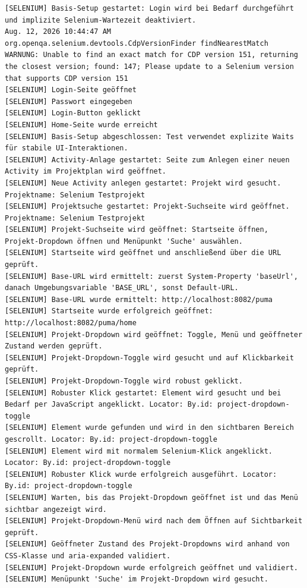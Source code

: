 \begin{lstlisting}[caption={Selenium -- Neue Activity (Erfolgreich)}, label={lst:sel_new_act_ok}, style=logStyle]
[SELENIUM] Basis-Setup gestartet: Login wird bei Bedarf durchgeführt und implizite Selenium-Wartezeit deaktiviert.
Aug. 12, 2026 10:44:47 AM org.openqa.selenium.devtools.CdpVersionFinder findNearestMatch
WARNUNG: Unable to find an exact match for CDP version 151, returning the closest version; found: 147; Please update to a Selenium version that supports CDP version 151
[SELENIUM] Login-Seite geöffnet
[SELENIUM] Passwort eingegeben
[SELENIUM] Login-Button geklickt
[SELENIUM] Home-Seite wurde erreicht
[SELENIUM] Basis-Setup abgeschlossen: Test verwendet explizite Waits für stabile UI-Interaktionen.
[SELENIUM] Activity-Anlage gestartet: Seite zum Anlegen einer neuen Activity im Projektplan wird geöffnet.
[SELENIUM] Neue Activity anlegen gestartet: Projekt wird gesucht. Projektname: Selenium Testprojekt
[SELENIUM] Projektsuche gestartet: Projekt-Suchseite wird geöffnet. Projektname: Selenium Testprojekt
[SELENIUM] Projekt-Suchseite wird geöffnet: Startseite öffnen, Projekt-Dropdown öffnen und Menüpunkt 'Suche' auswählen.
[SELENIUM] Startseite wird geöffnet und anschließend über die URL geprüft.
[SELENIUM] Base-URL wird ermittelt: zuerst System-Property 'baseUrl', danach Umgebungsvariable 'BASE_URL', sonst Default-URL.
[SELENIUM] Base-URL wurde ermittelt: http://localhost:8082/puma
[SELENIUM] Startseite wurde erfolgreich geöffnet: http://localhost:8082/puma/home
[SELENIUM] Projekt-Dropdown wird geöffnet: Toggle, Menü und geöffneter Zustand werden geprüft.
[SELENIUM] Projekt-Dropdown-Toggle wird gesucht und auf Klickbarkeit geprüft.
[SELENIUM] Projekt-Dropdown-Toggle wird robust geklickt.
[SELENIUM] Robuster Klick gestartet: Element wird gesucht und bei Bedarf per JavaScript angeklickt. Locator: By.id: project-dropdown-toggle
[SELENIUM] Element wurde gefunden und wird in den sichtbaren Bereich gescrollt. Locator: By.id: project-dropdown-toggle
[SELENIUM] Element wird mit normalem Selenium-Klick angeklickt. Locator: By.id: project-dropdown-toggle
[SELENIUM] Robuster Klick wurde erfolgreich ausgeführt. Locator: By.id: project-dropdown-toggle
[SELENIUM] Warten, bis das Projekt-Dropdown geöffnet ist und das Menü sichtbar angezeigt wird.
[SELENIUM] Projekt-Dropdown-Menü wird nach dem Öffnen auf Sichtbarkeit geprüft.
[SELENIUM] Geöffneter Zustand des Projekt-Dropdowns wird anhand von CSS-Klasse und aria-expanded validiert.
[SELENIUM] Projekt-Dropdown wurde erfolgreich geöffnet und validiert.
[SELENIUM] Menüpunkt 'Suche' im Projekt-Dropdown wird gesucht.

\end{lstlisting}
